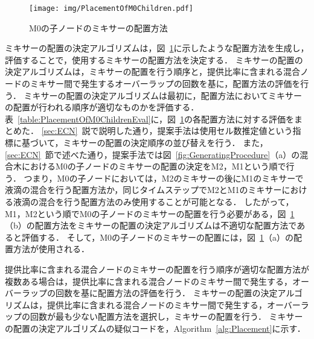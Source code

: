 \begin{figure}[tbp]
    \centering\texttt{[image: img/PlacementOfM0Children.pdf]}
 \caption{M0の子ノードのミキサーの配置方法}\label{fig:PlacementOfM0Children}
\end{figure}


ミキサーの配置の決定アルゴリズムは，図~\ref{fig:PlacementOfM0Children}に示したような配置方法を生成し，評価することで，使用するミキサーの配置方法を決定する．
ミキサーの配置の決定アルゴリズムは，ミキサーの配置を行う順序と，提供比率に含まれる混合ノードのミキサー間で発生するオーバーラップの回数を基に，配置方法の評価を行う．
ミキサーの配置の決定アルゴリズムは最初に，配置方法においてミキサーの配置が行われる順序が適切なものかを評価する．
表~\ref{table:PlacementOfM0ChildrenEval}に，図~\ref{fig:PlacementOfM0Children}の各配置方法に対する評価をまとめた．
\ref{sec:ECN}~説で説明した通り，提案手法は使用セル数推定値という指標に基づいて，ミキサーの配置の決定順序の並び替えを行う．
また，\ref{sec:ECN}~節で述べた通り，提案手法では図~\ref{fig:GeneratingProcedure}（a）の混合木におけるM0の子ノードのミキサーの配置の決定をM2，M1という順で行う．
つまり，M0の子ノードにおいては，M2のミキサーの後にM1のミキサーで液滴の混合を行う配置方法か，同じタイムステップでM2とM1のミキサーにおける液滴の混合を行う配置方法のみ使用することが可能となる．
したがって，M1，M2という順でM0の子ノードのミキサーの配置を行う必要がある，図~\ref{fig:PlacementOfM0Children}（b）の配置方法をミキサーの配置の決定アルゴリズムは不適切な配置方法であると評価する．
そして，M0の子ノードのミキサーの配置には，図~\ref{fig:PlacementOfM0Children}（a）の配置方法が使用される．

提供比率に含まれる混合ノードのミキサーの配置を行う順序が適切な配置方法が複数ある場合は，提供比率に含まれる混合ノードのミキサー間で発生する，オーバーラップの回数を基に配置方法の評価を行う．
ミキサーの配置の決定アルゴリズムは，提供比率に含まれる混合ノードのミキサー間で発生する，オーバーラップの回数が最も少ない配置方法を選択し，ミキサーの配置を行う．
ミキサーの配置の決定アルゴリズムの疑似コードを，Algorithm~\ref{alg:Placement}に示す．

